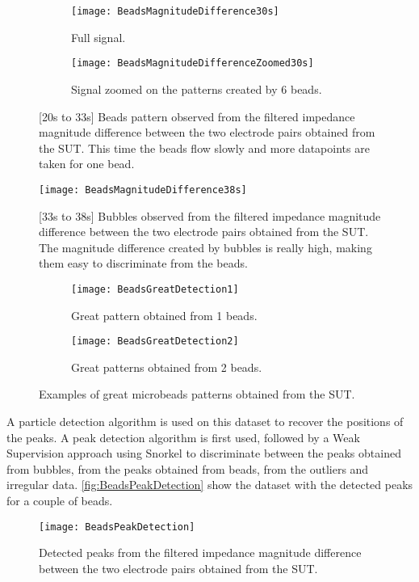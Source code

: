 \begin{figure}[h]
\centering
\begin{subfigure}{0.99\textwidth}
\centering
    \texttt{[image: BeadsMagnitudeDifference30s]}
    \caption{Full signal.}
    \label{fig:BeadsMagnitudeDifference30s}
\end{subfigure}
\begin{subfigure}{0.99\textwidth}
\centering
    \texttt{[image: BeadsMagnitudeDifferenceZoomed30s]}
    \caption{Signal zoomed on the patterns created by 6 beads.}
    \label{fig:BeadsMagnitudeDifferenceZoomed30s}
\end{subfigure}
\caption{[20s to 33s] Beads pattern observed from the filtered impedance magnitude difference between the two electrode pairs obtained from the SUT. This time the beads flow slowly and more datapoints are taken for one bead.}
\label{fig:BeadsImpedanceDifference30s}
\end{figure}

\begin{figure}[h]
\centering
\texttt{[image: BeadsMagnitudeDifference38s]}
\caption{[33s to 38s] Bubbles observed from the filtered impedance magnitude difference between the two electrode pairs obtained from the SUT. The magnitude difference created by bubbles is really high, making them easy to discriminate from the beads.}
\label{fig:BeadsImpedanceDifference38s}
\end{figure}

\begin{figure}[h]
\centering
\begin{subfigure}{0.49\textwidth}
\centering
    \texttt{[image: BeadsGreatDetection1]}
    \caption{Great pattern obtained from 1 beads.}
    \label{fig:BeadsGreatDetection1}
\end{subfigure}
\begin{subfigure}{0.49\textwidth}
\centering
    \texttt{[image: BeadsGreatDetection2]}
    \caption{Great patterns obtained from 2 beads.}
    \label{fig:BeadsGreatDetection2}
\end{subfigure}
\caption{Examples of great microbeads patterns obtained from the SUT.}
\label{fig:BeadsGreatDetection}
\end{figure}

A particle detection algorithm is used on this dataset to recover the positions of the peaks. A peak detection algorithm is first used, followed by a Weak Supervision approach  \cite{ratner2017snorkel} using Snorkel to discriminate between the peaks obtained from bubbles, from the peaks obtained from beads, from the outliers and irregular data. \autoref{fig:BeadsPeakDetection} show the dataset with the detected peaks for a couple of beads. \par
\begin{figure}[h]
\centering
\texttt{[image: BeadsPeakDetection]}
\caption{Detected peaks from the filtered impedance magnitude difference between the two electrode pairs obtained from the SUT.}
\label{fig:BeadsPeakDetection}
\end{figure}

